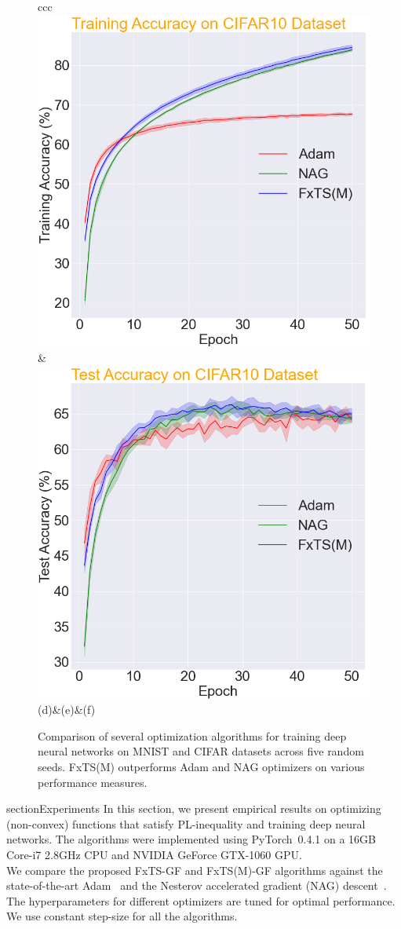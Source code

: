 \documentclass[letterpaper]{article}
\begin{document}
\begin{figure}[!ht]
\begin{center}
\begin{tabular}{ccc}
			\includegraphics[width=0.5\columnwidth]{Figures/TrainAcc_CIFAR10.png}&
			\includegraphics[width=0.5\columnwidth]{Figures/TestAcc_CIFAR10.png}\cr
			(d)&(e)&(f)
		\end{tabular}
		\caption{Comparison of several optimization algorithms for training deep neural networks on MNIST and CIFAR datasets across five random seeds. FxTS(M) outperforms Adam and NAG optimizers on various performance measures.}
		\label{fig:NN}
	\end{center}
\end{figure}

section{Experiments} \label{sec: experiments}%
In this section, we present empirical results on optimizing (non-convex) functions that satisfy PL-inequality and training deep neural networks. The algorithms were implemented using PyTorch~0.4.1 on a 16GB Core-i7 2.8GHz CPU and NVIDIA GeForce GTX-1060 GPU.\\
 We compare the proposed FxTS-GF and FxTS(M)-GF algorithms against the state-of-the-art Adam~\cite{kingma2015adam} and the Nesterov accelerated gradient (NAG) descent~\cite{polyak1964some, sutskever2013importance}. The hyperparameters for different optimizers are tuned for optimal performance. We use constant step-size for all the algorithms.
\end{document}
